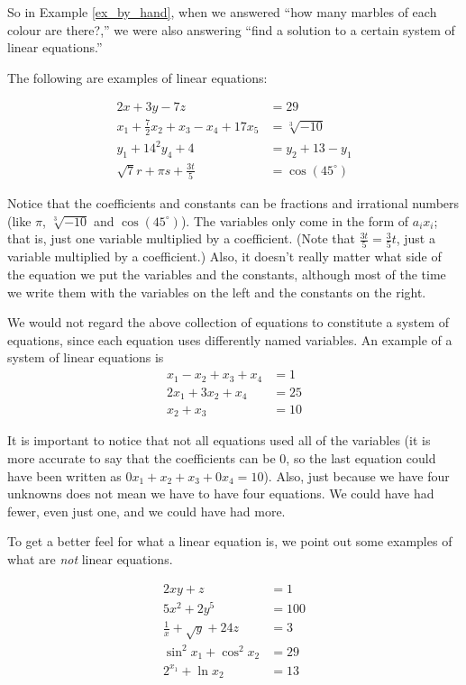 \smallskip

So in Example \ref{ex_by_hand}, when we answered ``how many marbles of each colour are there?,'' we were also answering ``find a solution to a certain system of linear equations.''

The following are examples of linear equations:

\begin{align*}
2x+3y-7z&=29\\
x_1+\frac72x_2+x_3-x_4+17x_5&=\sqrt[3]{-10}\\
y_1+14^2y_4+4&=y_2+13-y_1\\
\sqrt{7}r+\pi s +\frac{3t}{5}&= \cos(45^\circ)
\end{align*}

Notice that the coefficients and constants can be fractions and irrational numbers (like $\pi$, $\sqrt[3]{-10}$ and $\cos(45^\circ)$). The variables only come in the form of $a_ix_i$; that is, just one variable multiplied by a coefficient. (Note that $\frac{3t}{5} = \frac35t$, just a variable multiplied by a coefficient.) Also, it doesn't really matter what side of the equation we put the variables and the constants, although most of the time we write them with the variables on the left and the constants on the right. 

We would not regard the above collection of equations to constitute a system of equations, since each equation uses differently named variables. An example of a system of linear equations is 
\begin{align*}
x_1-x_2+x_3+x_4&=1\\
2x_1+3x_2+x_4 &= 25\\
x_2+x_3&=10
\end{align*}

It is important to notice that not all equations used all of the variables (it is more accurate to say that the coefficients can be 0, so the last equation could have been written as $0x_1+x_2+x_3+0x_4 = 10$). Also, just because we have four unknowns does not mean we have to have four equations. We could have had fewer, even just one, and we could have had more.

To get a better feel for what a linear equation is, we point out some examples of what are {\em not} linear equations.

\begin{align*}
2xy+z&=1\\
5x^2+2y^5&=100\\
\frac1x+\sqrt{y}+24z&=3\\
\sin^2x_1+\cos^2x_2 &= 29\\
2^{x_1} + \ln x_2 &= 13
\end{align*}

